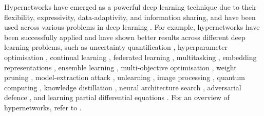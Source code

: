 Hypernetworks have emerged as a powerful deep learning technique due to their flexibility, expressivity, data-adaptivity, and information sharing, and have been used across various problems in deep learning \cite{chauhan2024brief}. For example, hypernetworks have been successfully applied and have shown better results across different deep learning problems, such as uncertainty quantification \cite{deutsch2019generative,Chan2024}, hyperparameter optimisation \cite{lorraine2018stochastic}, continual learning \cite{Oswald2020Continual}, federated learning \cite{shin2024effective}, multitasking \cite{tay2021hypergrid}, embedding representations \cite{yoo2024hyper}, ensemble learning \cite{kristiadi2019predictive}, multi-objective optimisation \cite{Tuan2024}, weight pruning \cite{liu2019metapruning}, model-extraction attack \cite{yuan2024hypertheft}, unlearning \cite{rangel2024learning}, image processing \cite{Ramanarayanan_2023_ICCV,Zhou2024}, quantum computing \cite{carrasquilla2023quantum}, knowledge distillation \cite{wu2023hyperinr}, neural architecture search \cite{peng2020cream}, adversarial defence \cite{sun2017hypernetworks}, and learning partial differential equations \cite{botteghi2025hyperl}. For an overview of hypernetworks, refer to \cite{chauhan2024brief}.

